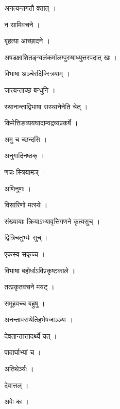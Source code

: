 \documentclass[10pt, openany]{book}
\begin{document}
\noindent अनत्यन्तगतौ क्तात् ।

\noindent न सामिवचने ।

\noindent बृहत्या आच्छादने ।

\noindent अषडक्षाशितङ्ग्वलंकर्मालम्पुरुषाध्युत्तरपदात् खः ।

\noindent विभाषा अञ्चेरदिक्स्त्रियाम् ।

\noindent जात्यन्ताच्छ बन्धुनि ।

\noindent स्थानान्ताद्विभाषा सस्थानेनेति चेत् ।

\noindent किमेत्तिङव्ययघादाम्वद्रव्यप्रकर्षे ।

\noindent अमु च च्छन्दसि ।

\noindent अनुगादिनष्ठक् ।

\noindent णचः स्त्रियामञ् ।

\noindent अणिनुणः ।

\noindent विसारिणो मत्स्ये ।

\noindent संख्यायाः क्रियाऽभ्यावृत्तिगणने कृत्वसुच् ।

\noindent द्वित्रिचतुर्भ्यः सुच् ।

\noindent एकस्य सकृच्च ।

\noindent विभाषा बहोर्धाऽविप्रकृष्टकाले ।

\noindent तत्प्रकृतवचने मयट् ।

\noindent समूहवच्च बहुषु ।

\noindent अनन्तावसथेतिहभेषजाञ्ञ्यः ।

\noindent देवतान्तात्तादर्थ्ये यत् ।

\noindent पादार्घाभ्यां च ।

\noindent अतिथेर्ञ्यः ।

\noindent देवात्तल् ।

\noindent अवेः कः ।
\end{document}
